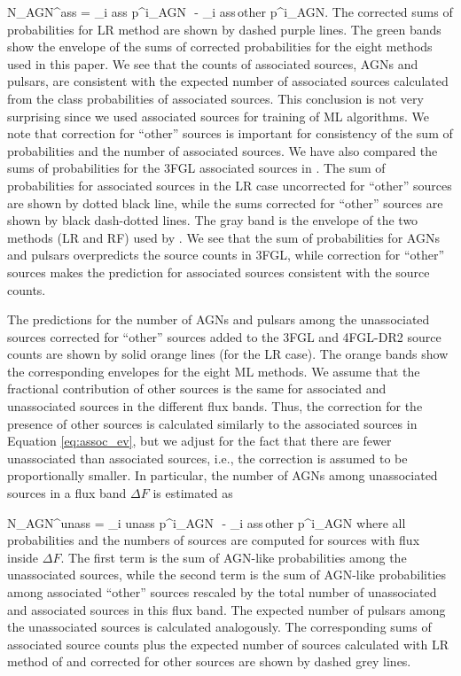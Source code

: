 \be
{}
N_{\rm AGN}^{\rm ass}  = \sum_{i \in \rm ass} p^i_{\rm AGN}\,\, - \sum_{i \in \rm ass\,other} p^i_{\rm AGN}.
\ee
The corrected sums of probabilities for LR method are shown by dashed purple lines.
The green bands show the envelope of the sums of corrected probabilities for the eight methods used in this paper.
We see that the counts of associated sources, AGNs and pulsars, are consistent with the expected number of associated sources
calculated from the class probabilities of associated sources.
This conclusion is not very surprising since we used associated sources for training of ML algorithms.
We note that correction for ``other'' sources is important for consistency of the sum of probabilities and the number of associated sources.
We have also compared the sums of probabilities for the 3FGL associated sources in \cite{2016ApJ...820....8S}.
The sum of probabilities for associated sources in the LR case uncorrected for ``other'' sources are shown by dotted black line,
while the sums corrected for ``other'' sources are shown by black dash-dotted lines.
The gray band is the envelope of the two methods (LR and RF) used by \cite{2016ApJ...820....8S}.
We see that the sum of probabilities for AGNs and pulsars overpredicts the source counts in 3FGL, 
while correction for ``other'' sources makes the prediction for associated sources consistent with the source counts.

The predictions for the number of AGNs and pulsars among the unassociated sources corrected for ``other'' sources 
added to the 3FGL and 4FGL-DR2  source counts are shown by solid orange lines (for the LR case).
The orange bands show the corresponding envelopes for the eight ML methods.
We assume that the fractional contribution of other sources is the same for associated and unassociated sources in the different flux bands.
Thus, the correction for the presence of other sources is calculated similarly to the associated sources in Equation \ref{eq:assoc_ev},
but we adjust for the fact that there are fewer unassociated than associated sources, i.e., 
the correction is assumed to be proportionally smaller.
In particular, the number of AGNs among unassociated sources in a flux band $\Delta F$ is estimated as

\be
{}
N_{\rm AGN}^{\rm unass} = \sum_{i \in \rm unass} p^i_{\rm AGN}\,\, - \sum_{i \in \rm ass\,other} p^i_{\rm AGN} \cdot 
{}
\ee
where all probabilities and the numbers of sources are computed for sources with flux inside $\Delta F$.
The first term is the sum of AGN-like probabilities among the unassociated sources,
while the second term is the sum of AGN-like probabilities among associated ``other'' sources rescaled by the total number
of unassociated and associated sources in this flux band.
The expected number of pulsars among the unassociated sources is calculated analogously.
The corresponding sums of associated source counts plus the expected number of sources calculated with LR method of \cite{2016ApJ...820....8S} 
and corrected for other sources are shown by dashed grey lines.


